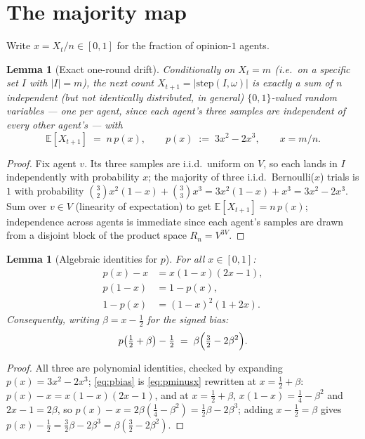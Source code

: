 \documentclass[11pt]{article}
\newtheorem{lemma}[theorem]{Lemma}
\newcommand{\E}{\mathbb{E}}
\begin{document}
\section{The majority map}\label{sec:map}

Write $x = X_t/n \in [0,1]$ for the fraction of opinion-$1$ agents.

\begin{lemma}[Exact one-round drift]\label{lem:drift}
Conditionally on $X_t = m$ (i.e.\ on a specific set $I$ with $|I|=m$), the
next count $X_{t+1} = |\mathrm{step}(I,\omega)|$ is exactly a sum of $n$
independent (but not identically distributed, in general) $\{0,1\}$-valued
random variables — one per agent, since each agent's three samples are
independent of every other agent's — with
\[
  \E[X_{t+1}] \;=\; n \, p(x), \qquad p(x) \;:=\; 3x^2 - 2x^3, \qquad x = m/n.
\]
\end{lemma}
\begin{proof}
Fix agent $v$. Its three samples are i.i.d.\ uniform on $V$, so each lands
in $I$ independently with probability $x$; the majority of three
i.i.d.\ Bernoulli($x$) trials is $1$ with probability $\binom32 x^2(1-x) +
\binom33 x^3 = 3x^2(1-x) + x^3 = 3x^2 - 2x^3$. Sum over $v \in V$ (linearity
of expectation) to get $\E[X_{t+1}] = n\,p(x)$; independence across agents
is immediate since each agent's samples are drawn from a disjoint block of
the product space $R_n = V^{3V}$.
\end{proof}

\begin{lemma}[Algebraic identities for $p$]\label{lem:pident}
For all $x \in [0,1]$:
\begin{align}
  p(x) - x &= x(1-x)(2x-1), \label{eq:pminusx}\\
  p(1-x) &= 1 - p(x), \label{eq:psymm}\\
  1 - p(x) &= (1-x)^2 (1+2x). \label{eq:pcomp}
\end{align}
Consequently, writing $\beta = x - \tfrac12$ for the signed bias:
\begin{equation}
  p\bigl(\tfrac12+\beta\bigr) - \tfrac12 \;=\; \beta\Bigl(\tfrac32 - 2\beta^2\Bigr).
  \label{eq:pbias}
\end{equation}
\end{lemma}
\begin{proof}
All three are polynomial identities, checked by expanding $p(x) = 3x^2 -
2x^3$; \eqref{eq:pbias} is \eqref{eq:pminusx} rewritten at $x =
\tfrac12+\beta$: $p(x)-x = x(1-x)(2x-1)$, and at $x=\tfrac12+\beta$,
$x(1-x) = \tfrac14-\beta^2$ and $2x-1=2\beta$, so $p(x)-x =
2\beta(\tfrac14-\beta^2) = \tfrac12\beta - 2\beta^3$; adding $x-\tfrac12 =
\beta$ gives $p(x)-\tfrac12 = \tfrac32\beta - 2\beta^3 = \beta(\tfrac32 -
2\beta^2)$.
\end{proof}
\end{document}
